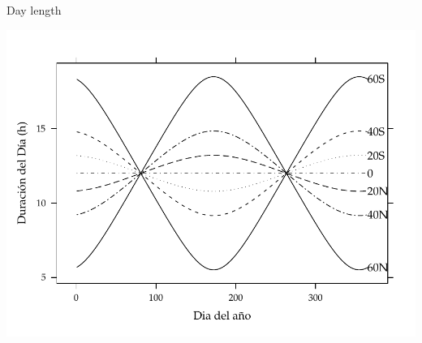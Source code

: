 \documentclass[xcolor={usenames,svgnames,dvipsnames}]{beamer}
\begin{document}
\begin{frame}[label={sec:org83fade1}]{Day length}
\begin{center}
\includegraphics[width=.9\linewidth]{../figs/DuracionDia.pdf}
\end{center}
\end{frame}
\end{document}
